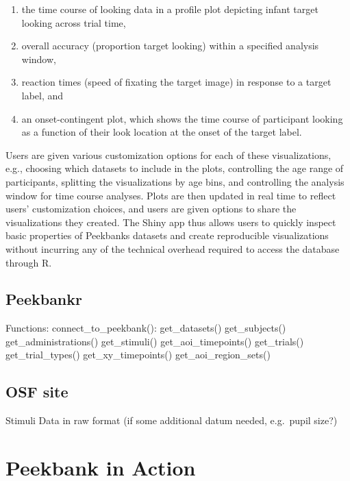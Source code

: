 \documentclass[
  english,
  man,floatsintext]{apa6}
\providecommand{\tightlist}{%
  \setlength{\itemsep}{0pt}\setlength{\parskip}{0pt}}
\begin{document}
\begin{enumerate}
\def\labelenumi{\arabic{enumi}.}
\tightlist
\item
  the time course of looking data in a profile plot depicting infant target looking across trial time,
\item
  overall accuracy (proportion target looking) within a specified analysis window,
\item
  reaction times (speed of fixating the target image) in response to a target label, and
\item
  an onset-contingent plot, which shows the time course of participant looking as a function of their look location at the onset of the target label.
\end{enumerate}

Users are given various customization options for each of these visualizations, e.g., choosing which datasets to include in the plots, controlling the age range of participants, splitting the visualizations by age bins, and controlling the analysis window for time course analyses.
Plots are then updated in real time to reflect users' customization choices, and users are given options to share the visualizations they created.
The Shiny app thus allows users to quickly inspect basic properties of Peekbanks datasets and create reproducible visualizations without incurring any of the technical overhead required to access the database through R.

\hypertarget{peekbankr}{%
\subsection{Peekbankr}\label{peekbankr}}

Functions: connect\_to\_peekbank(): get\_datasets() get\_subjects() get\_administrations() get\_stimuli() get\_aoi\_timepoints() get\_trials() get\_trial\_types() get\_xy\_timepoints() get\_aoi\_region\_sets()

\hypertarget{osf-site}{%
\subsection{OSF site}\label{osf-site}}

Stimuli Data in raw format (if some additional datum needed, e.g.~pupil size?)

\hypertarget{peekbank-in-action}{%
\section{Peekbank in Action}\label{peekbank-in-action}}
\end{document}
